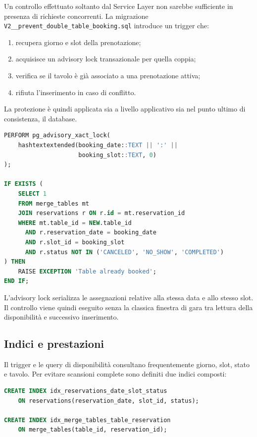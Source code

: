 \documentclass[12pt,a4paper]{article}
\newcommand{\code}[1]{\nolinkurl{#1}}
\begin{document}
Un controllo effettuato soltanto dal Service Layer non sarebbe sufficiente in
presenza di richieste concorrenti. La migrazione
\code{V2\_\_prevent\_double\_table\_booking.sql} introduce un trigger che:

\begin{enumerate}[leftmargin=*]
  \item recupera giorno e slot della prenotazione;
  \item acquisisce un advisory lock transazionale per quella coppia;
  \item verifica se il tavolo è già associato a una prenotazione attiva;
  \item rifiuta l'inserimento in caso di conflitto.
\end{enumerate}

La protezione è quindi applicata sia a livello applicativo sia nel punto ultimo
di consistenza, il database.

\begin{lstlisting}[style=codeStyle,language=SQL,
caption={Controllo concorrente contro la doppia prenotazione.}]
PERFORM pg_advisory_xact_lock(
    hashtextextended(booking_date::TEXT || ':' ||
                     booking_slot::TEXT, 0)
);

IF EXISTS (
    SELECT 1
    FROM merge_tables mt
    JOIN reservations r ON r.id = mt.reservation_id
    WHERE mt.table_id = NEW.table_id
      AND r.reservation_date = booking_date
      AND r.slot_id = booking_slot
      AND r.status NOT IN ('CANCELED', 'NO_SHOW', 'COMPLETED')
) THEN
    RAISE EXCEPTION 'Table already booked';
END IF;
\end{lstlisting}

L'advisory lock serializza le assegnazioni relative alla stessa data e allo
stesso slot. Il controllo viene quindi eseguito senza la classica finestra di
gara tra lettura della disponibilità e successivo inserimento.

\subsection{Indici e prestazioni}

Il trigger e le query di disponibilità consultano frequentemente giorno, slot,
stato e tavolo. Per evitare scansioni complete sono definiti due indici
composti:

\begin{lstlisting}[style=codeStyle,language=SQL,
caption={Indici a supporto delle prenotazioni.}]
CREATE INDEX idx_reservations_date_slot_status
    ON reservations(reservation_date, slot_id, status);

CREATE INDEX idx_merge_tables_table_reservation
    ON merge_tables(table_id, reservation_id);
\end{lstlisting}
\end{document}
